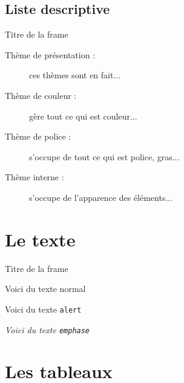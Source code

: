 \documentclass{bredelebeamer}
\begin{document}
		\subsection{Liste descriptive} 
\begin{frame}{Titre de la frame} 
	\begin{description}
		\item [Thème de présentation : ] ces thèmes sont en fait...
		\item [Thème de couleur : ] gère tout ce qui est couleur...
		\item [Thème de police : ] s'occupe de tout ce qui est police, gras...
		\item [Thème interne : ] s'occupe de l'apparence des éléments...
	\end{description}
\end{frame}



\section{Le texte}

\begin{frame}{Titre de la frame} 

Voici du texte normal

\alert{Voici du texte \texttt{alert}}


\emph{Voici du texte \texttt{emphase}}

\end{frame}


\section{Les tableaux}
\end{document}
